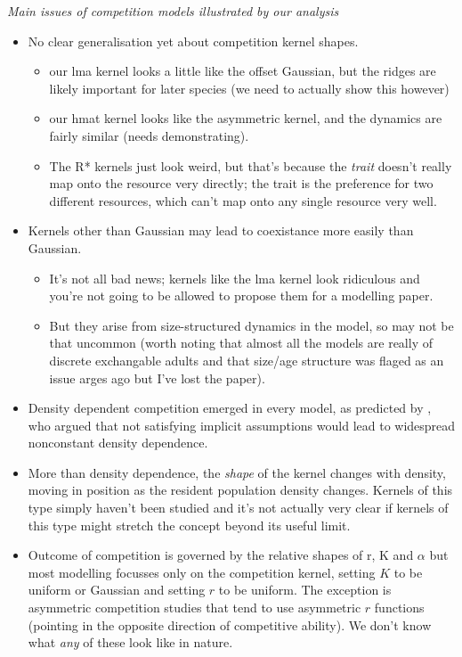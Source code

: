 \documentclass[a4paper,11pt]{article}
\begin{document}
\textit{Main issues of competition models illustrated by our analysis}
\begin{itemize}
\item No clear generalisation yet about competition kernel shapes.
  \begin{itemize}
  \item our lma kernel looks a little like the
    \citet{Roughgarden-1979} offset Gaussian, but the ridges are
    likely important for later species (we need to actually show this
    however)
  \item our hmat kernel looks like the \citet{Kisdi-1999} asymmetric
    kernel, and the dynamics are fairly similar (needs
    demonstrating).
  \item The R* kernels just look weird, but that's because the
    \emph{trait} doesn't really map onto the resource very directly;
    the trait is the preference for two different resources, which
    can't map onto any single resource very well.
  \end{itemize}
\item Kernels other than Gaussian may lead to coexistance more easily
  than Gaussian.
  \begin{itemize}
  \item It's not all bad news; kernels like the lma kernel look
    ridiculous and you're not going to be allowed to propose them for
    a modelling paper.
  \item But they arise from size-structured dynamics in the model, so
    may not be that uncommon (worth noting that almost all the models
    are really of discrete exchangable adults and that size/age
    structure was flaged as an issue arges ago but I've lost the
    paper).
  \end{itemize}
\item Density dependent competition emerged in every model, as
  predicted by \citet{Abrams-1980}, who argued that not satisfying
  implicit assumptions would lead to widespread nonconstant density
  dependence.
\item More than density dependence, the \emph{shape} of the kernel
  changes with density, moving in position as the resident population
  density changes.  Kernels of this type simply haven't been studied
  and it's not actually very clear if kernels of this type might
  stretch the concept beyond its useful limit.
\item Outcome of competition is governed by the relative shapes of r,
  K and $\alpha$ but most modelling focusses only on the competition
  kernel, setting $K$ to be uniform or Gaussian and setting $r$ to be
  uniform.  The exception is asymmetric competition studies that tend
  to use asymmetric $r$ functions (pointing in the opposite direction
  of competitive ability). We don't know what \emph{any} of these look
  like in nature.
\end{itemize}
\end{document}
